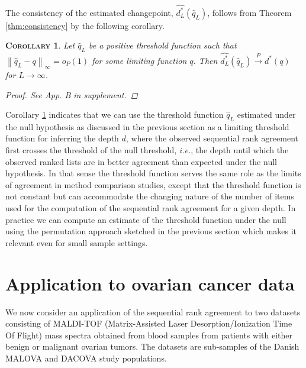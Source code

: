 \documentclass[oupdraft]{bio}
\makeatletter
\newcommand{\ie}{\emph{i.e.}\@\xspace}
\newtheorem{corollary}{\normalfont\scshape Corollary}[section]
\makeatother
\begin{document}
The consistency of the estimated changepoint, $\widehat{d^\ast_L}(\widehat{q}_L)$, follows from Theorem \ref{thm:consistency} by the following corollary. 
\begin{corollary}\label{thecor}
Let $\widehat{q}_L$ be a positive threshold function such that $\left\|\widehat{q}_L - q\right\|_\infty = o_P(1)$ for some limiting
function $q$.  Then $\widehat{d^\ast_L}(\widehat{q}_L) \overset{P}{\longrightarrow} d^\ast(q)$ for $L \rightarrow \infty$.
\label{cor:consistency}
\begin{proof}
See App. B in supplement.%
\end{proof}
\end{corollary}


Corollary \ref{thecor} indicates that we can use the threshold
function $\widehat{q}_L$ estimated under the null hypothesis as
discussed in the previous section as a limiting threshold function for
inferring the depth $d$, where the observed sequential rank agreement
first crosses the threshold of the null threshold, \ie, the depth
until which the observed ranked lists are in better agreement than
expected under the null hypothesis. In that sense the threshold
function serves the same role as the limits of agreement in method
comparison studies, except that the threshold function is not constant
but can accommodate the changing nature of the number of items used
for the computation of the sequential rank agreement for a given depth.
%
In practice we can compute an estimate of the threshold function under
the null using the permutation approach sketched in the previous
section which makes it relevant even for small sample settings.


\section{Application to ovarian cancer data}
We now consider an application of the sequential rank agreement to two
datasets consisting of MALDI-TOF (Matrix-Assisted Laser
Desorption/Ionization Time Of Flight) mass spectra obtained from blood
samples from patients with either benign or malignant ovarian
tumors. The datasets are sub-samples of the Danish MALOVA and DACOVA
study populations.
\end{document}
